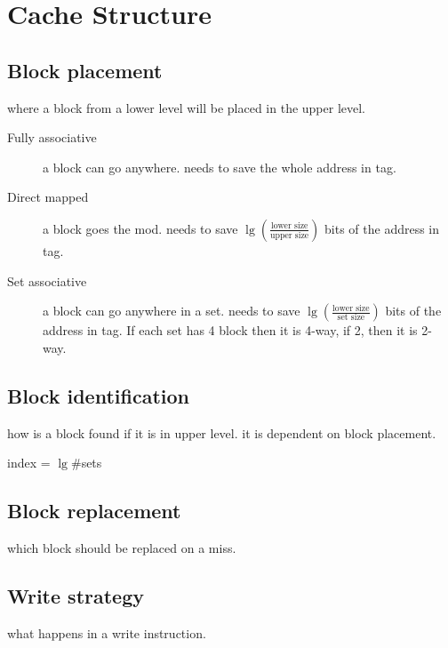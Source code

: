 \section{Cache Structure}
\subsection{Block placement}
where a block from a lower level will be placed in the upper level.
\begin{description}
    \item[Fully associative] a block can go anywhere. needs to save the whole address in tag.
    \item[Direct mapped]  a block goes the mod. needs to save \( \lg \!\left(\frac{\text{lower size}}{\text{upper size}}\right)\) bits of the address in tag.
    \item[Set associative] a block can go anywhere in a set.  needs to save \( \lg \!\left(\frac{\text{lower size}}{\text{set size}}\right)\) bits of the address in tag. If each set has 4 block then it is 4-way, if 2, then it is 2-way.
\end{description}
\subsection{Block identification}
how is a block found if it is in upper level. it is dependent on block placement.
\begin{center}
    index = \(\lg \#\)sets
\end{center}
\subsection{Block replacement}
which block should be replaced on a miss.
\subsection{Write strategy}
what happens in a write instruction.